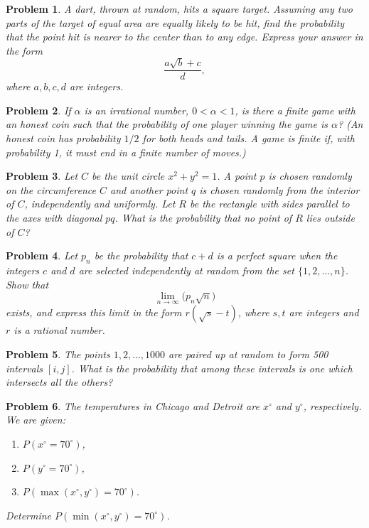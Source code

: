 \documentclass[12pt]{article}
\newtheorem{problem}{Problem}
\begin{document}
\begin{problem}
A dart, thrown at random, hits a square target. Assuming any two parts of the target of
equal area are equally likely to be hit, find the probability that the point hit is nearer to the
center than to any edge. Express your answer in the form
\[
\frac{a\sqrt{b}+c}{d},
\]
where $a,b,c,d$ are integers.
\end{problem}

\begin{problem}
If $\alpha$ is an irrational number, $0<\alpha<1$, is there a finite game with an honest coin such
that the probability of one player winning the game is $\alpha$? (An honest coin has probability
$1/2$ for both heads and tails. A game is finite if, with probability 1, it must end in a finite
number of moves.)
\end{problem}

\begin{problem}
Let $C$ be the unit circle $x^2+y^2=1$. A point $p$ is chosen randomly on the circumference
$C$ and another point $q$ is chosen randomly from the interior of $C$, independently and uniformly.
Let $R$ be the rectangle with sides parallel to the axes with diagonal $pq$. What is the probability
that no point of $R$ lies outside of $C$?
\end{problem}

\begin{problem}
Let $p_n$ be the probability that $c+d$ is a perfect square when the integers $c$ and $d$ are selected
independently at random from the set $\{1,2,\dots,n\}$. Show that
\[
\lim_{n\to\infty} \big( p_n \sqrt{n} \big)
\]
exists, and express this limit in the form $r(\sqrt{s}-t)$, where $s,t$ are integers and $r$ is a rational number.
\end{problem}

\begin{problem}
The points $1,2,\dots,1000$ are paired up at random to form 500 intervals $[i,j]$. What is the
probability that among these intervals is one which intersects all the others?
\end{problem}

\begin{problem}
The temperatures in Chicago and Detroit are $x^\circ$ and $y^\circ$, respectively. We are given:
\begin{enumerate}
\item $P(x^\circ = 70^\circ)$,
\item $P(y^\circ = 70^\circ)$,
\item $P(\max(x^\circ,y^\circ)=70^\circ)$.
\end{enumerate}
Determine $P(\min(x^\circ,y^\circ)=70^\circ)$.
\end{problem}
\end{document}
